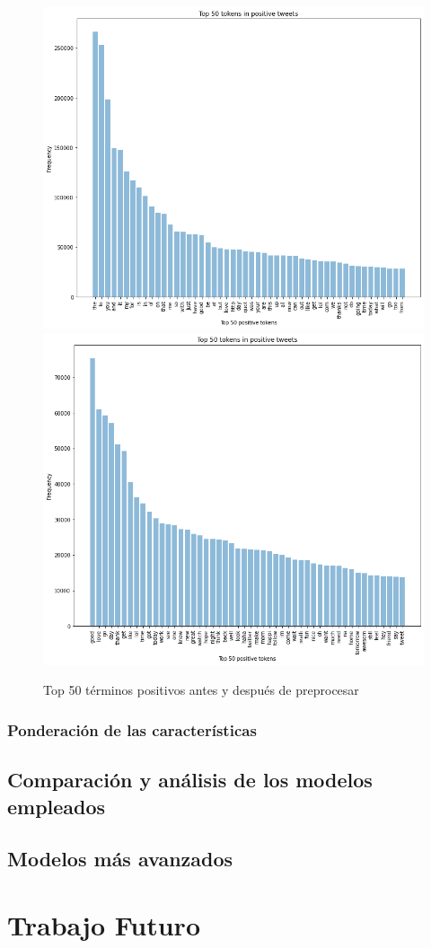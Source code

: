 \documentclass[a4paper,12pt]{report}
\begin{document}
\begin{figure}[htbp!]
\begin{center}
\includegraphics[scale=0.3]{images/pos.png}
\includegraphics[scale=0.3]{images/pos_clean.png}
\end{center}
\caption{Top 50 términos positivos antes y después de preprocesar}
\end{figure}


\subsection{Ponderación de las características}

\section{Comparación y análisis de los modelos empleados}


\section{Modelos más avanzados}





\chapter{Trabajo Futuro}
\end{document}
